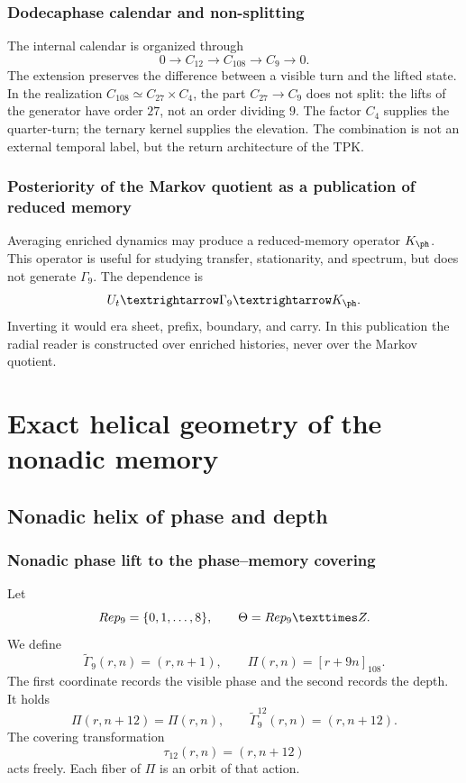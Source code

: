 \section{Dodecaphase calendar and non-splitting}

The internal calendar is organized through
\[
 0\longrightarrow C_{12}\longrightarrow C_{108}
 \longrightarrow C_9\longrightarrow0.
\]
The extension preserves the difference between a visible turn and the lifted
state. In the realization
\(C_{108}\simeq C_{27}\times C_4\), the part \(C_{27}\to C_9\) does not
split: the lifts of the generator have order \(27\), not an order
dividing \(9\). The factor \(C_4\) supplies the quarter-turn; the ternary
kernel supplies the elevation. The combination is not an external temporal label,
but the return architecture of the TPK.

\section{Posteriority of the Markov quotient as a publication of reduced memory}

Averaging enriched dynamics may produce a reduced-memory operator
\(K_{\ph}\). This operator is useful for studying transfer, stationarity,
and spectrum, but does not generate \(\Gamma_9\). The dependence is
\[
 U_t\longrightarrow\Gamma_9\longrightarrow K_{\ph}.
\]
Inverting it would era sheet, prefix, boundary, and carry. In this publication the
radial reader is constructed over enriched histories, never over the
Markov quotient.

\part{Exact helical geometry of the nonadic memory}

\chapter{Nonadic helix of phase and depth}

\section{Nonadic phase lift to the phase--memory covering}

Let
\[
 \operatorname{Rep}_9=\{0,1,\ldots,8\},
 \qquad \widetilde\Theta=\operatorname{Rep}_9\times\Z.
\]
We define
\begin{equation}
 \widetilde\Gamma_9(r,n)=(r,n+1),
 \qquad
 \Pi(r,n)=[r+9n]_{108}.
 \label{espiral:eq:cobertura-helice}
\end{equation}
The first coordinate records the visible phase and the second records the depth.
It holds
\[
 \Pi(r,n+12)=\Pi(r,n),
 \qquad
 \widetilde\Gamma_9^{12}(r,n)=(r,n+12).
\]
The covering transformation
\[
 \tau_{12}(r,n)=(r,n+12)
\]
acts freely. Each fiber of \(\Pi\) is an orbit of that action.

